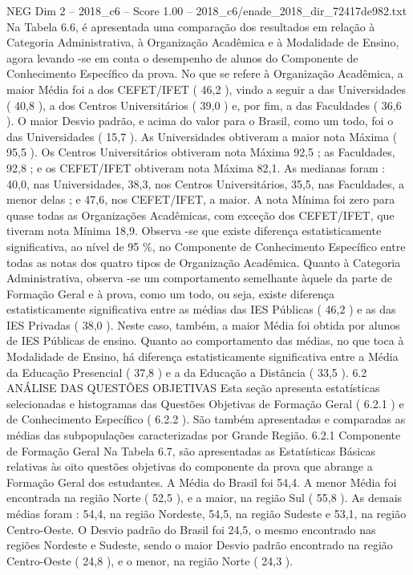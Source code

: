 \begin{textsample}{NEG Dim 2 – 2018\_c6 – Score 1.00 – 2018\_c6/enade\_2018\_dir\_72417de982.txt}
Na Tabela 6.6, é apresentada uma comparação dos resultados em relação à Categoria Administrativa, à Organização Acadêmica e à Modalidade de Ensino, agora levando -se em conta o desempenho de alunos do Componente de Conhecimento Específico da prova.
No que se refere à Organização Acadêmica, a maior Média foi a dos CEFET/IFET ( 46,2 ), vindo a seguir a das Universidades ( 40,8 ), a dos Centros Universitários ( 39,0 ) e, por fim, a das Faculdades ( 36,6 ).
O maior Desvio padrão, e acima do valor para o Brasil, como um todo, foi o das Universidades ( 15,7 ).
As Universidades obtiveram a maior nota Máxima ( 95,5 ).
Os Centros Universitários obtiveram nota Máxima 92,5 ; as Faculdades, 92,8 ; e os CEFET/IFET obtiveram nota Máxima 82,1.
As medianas foram : 40,0, nas Universidades, 38,3, nos Centros Universitários, 35,5, nas Faculdades, a menor delas ; e 47,6, nos CEFET/IFET, a maior.
A nota Mínima foi zero para quase todas as Organizações Acadêmicas, com exceção dos CEFET/IFET, que tiveram nota Mínima 18,9.
Observa -se que existe diferença estatisticamente significativa, ao nível de 95 \%, no Componente de Conhecimento Específico entre todas as notas dos quatro tipos de Organização Acadêmica.
Quanto à Categoria Administrativa, observa -se um comportamento semelhante àquele da parte de Formação Geral e à prova, como um todo, ou seja, existe diferença estatisticamente significativa entre as médias das IES Públicas ( 46,2 ) e as das IES Privadas ( 38,0 ).
Neste caso, também, a maior Média foi obtida por alunos de IES Públicas de ensino.
Quanto ao comportamento das médias, no que toca à Modalidade de Ensino, há diferença estatisticamente significativa entre a Média da Educação Presencial ( 37,8 ) e a da Educação a Distância ( 33,5 ). 6.2 ANÁLISE DAS QUESTÕES OBJETIVAS Esta seção apresenta estatísticas selecionadas e histogramas das Questões Objetivas de Formação Geral ( 6.2.1 ) e de Conhecimento Específico ( 6.2.2 ).
São também apresentadas e comparadas as médias das subpopulações caracterizadas por Grande Região. 6.2.1 Componente de Formação Geral Na Tabela 6.7, são apresentadas as Estatísticas Básicas relativas às oito questões objetivas do componente da prova que abrange a Formação Geral dos estudantes.
A Média do Brasil foi 54,4.
A menor Média foi encontrada na região Norte ( 52,5 ), e a maior, na região Sul ( 55,8 ).
As demais médias foram : 54,4, na região Nordeste, 54,5, na região Sudeste e 53,1, na região Centro-Oeste.
O Desvio padrão do Brasil foi 24,5, o mesmo encontrado nas regiões Nordeste e Sudeste, sendo o maior Desvio padrão encontrado na região Centro-Oeste ( 24,8 ), e o menor, na região Norte ( 24,3 ).

\end{textsample}
